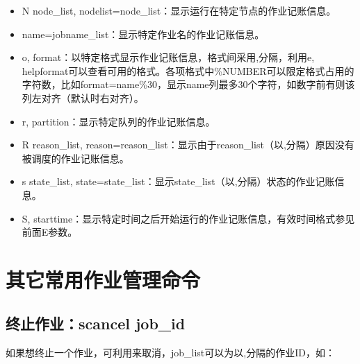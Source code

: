 \documentclass[a4paper,12pt,english]{sphinxmanual}
\begin{document}
\begin{itemize}
\item {} 
\sphinxAtStartPar
\sphinxhyphen{}N node\_list, \sphinxhyphen{}\sphinxhyphen{}nodelist=node\_list：显示运行在特定节点的作业记账信息。

\item {} 
\sphinxAtStartPar
\sphinxhyphen{}\sphinxhyphen{}name=jobname\_list：显示特定作业名的作业记账信息。

\item {} 
\sphinxAtStartPar
\sphinxhyphen{}o, \sphinxhyphen{}\sphinxhyphen{}format：以特定格式显示作业记账信息，格式间采用,分隔，利用\sphinxhyphen{}e, \sphinxhyphen{}\sphinxhyphen{}helpformat可以查看可用的格式。各项格式中\%NUMBER可以限定格式占用的字符数，比如format=name\%30，显示name列最多30个字符，如数字前有\sphinxhyphen{}则该列左对齐（默认时右对齐）。

\item {} 
\sphinxAtStartPar
\sphinxhyphen{}r, \sphinxhyphen{}\sphinxhyphen{}partition：显示特定队列的作业记账信息。

\item {} 
\sphinxAtStartPar
\sphinxhyphen{}R reason\_list, \sphinxhyphen{}\sphinxhyphen{}reason=reason\_list：显示由于reason\_list（以,分隔）原因没有被调度的作业记账信息。

\item {} 
\sphinxAtStartPar
\sphinxhyphen{}s state\_list, \sphinxhyphen{}\sphinxhyphen{}state=state\_list：显示state\_list（以,分隔）状态的作业记账信息。

\item {} 
\sphinxAtStartPar
\sphinxhyphen{}S, \sphinxhyphen{}\sphinxhyphen{}starttime：显示特定时间之后开始运行的作业记账信息，有效时间格式参见前面\sphinxhyphen{}E参数。

\end{itemize}


\section{其它常用作业管理命令}
\label{\detokenize{slurm/slurm:id48}}

\subsection{终止作业：scancel job\_id}
\label{\detokenize{slurm/slurm:scancel-job-id}}
\sphinxAtStartPar
如果想终止一个作业，可利用来取消，job\_list可以为以,分隔的作业ID，如：

\sphinxAtStartPar
{}
\end{document}
